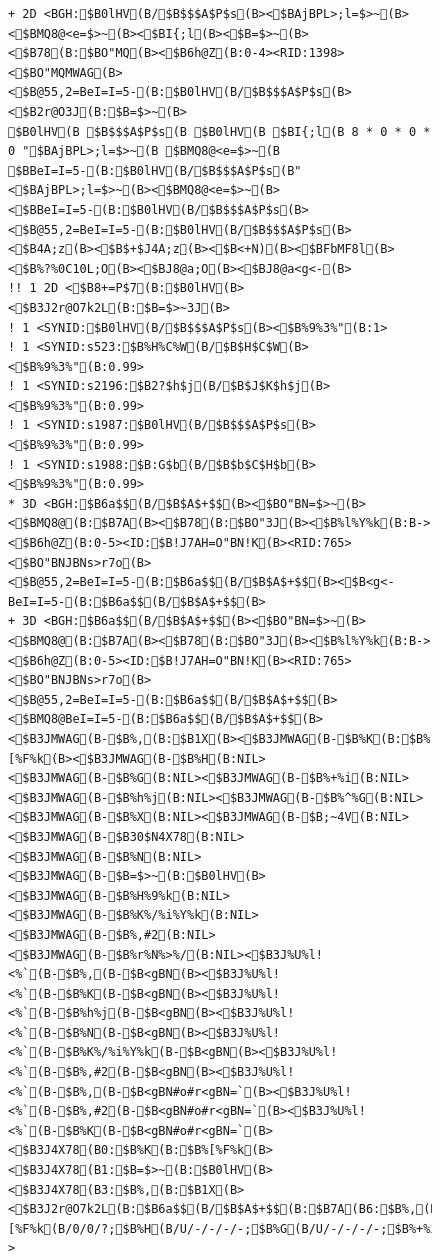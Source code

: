 \documentclass[a4j]{jarticle}
\begin{document}
{{{{{{{{{\begin{figure}[t]
\begin{center}
\begin{minipage}{\hsize}
\begin{verbatim}
+ 2D <BGH:$B0lHV(B/$B$$$A$P$s(B><$BAjBPL>;l=$>~(B><$BMQ8@<e=$>~(B><$BI{;l(B><$B=$>~(B><$B78(B:$BO"MQ(B><$B6h@Z(B:0-4><RID:1398><$BO"MQMWAG(B><$B@55,2=BeI=I=5-(B:$B0lHV(B/$B$$$A$P$s(B><$B2r@O3J(B:$B=$>~(B>
$B0lHV(B $B$$$A$P$s(B $B0lHV(B $BI{;l(B 8 * 0 * 0 * 0 "$BAjBPL>;l=$>~(B $BMQ8@<e=$>~(B $BBeI=I=5-(B:$B0lHV(B/$B$$$A$P$s(B" <$BAjBPL>;l=$>~(B><$BMQ8@<e=$>~(B><$BBeI=I=5-(B:$B0lHV(B/$B$$$A$P$s(B><$B@55,2=BeI=I=5-(B:$B0lHV(B/$B$$$A$P$s(B><$B4A;z(B><$B$+$J4A;z(B><$B<+N)(B><$BFbMF8l(B><$B%?%0C10L;O(B><$BJ8@a;O(B><$BJ8@a<g<-(B>
!! 1 2D <$B8+=P$7(B:$B0lHV(B><$B3J2r@O7k2L(B:$B=$>~3J(B>
! 1 <SYNID:$B0lHV(B/$B$$$A$P$s(B><$B%9%3%"(B:1>
! 1 <SYNID:s523:$B%H%C%W(B/$B$H$C$W(B><$B%9%3%"(B:0.99>
! 1 <SYNID:s2196:$B2?$h$j(B/$B$J$K$h$j(B><$B%9%3%"(B:0.99>
! 1 <SYNID:s1987:$B0lHV(B/$B$$$A$P$s(B><$B%9%3%"(B:0.99>
! 1 <SYNID:s1988:$B:G$b(B/$B$b$C$H$b(B><$B%9%3%"(B:0.99>
* 3D <BGH:$B6a$$(B/$B$A$+$$(B><$BO"BN=$>~(B><$BMQ8@(B:$B7A(B><$B78(B:$BO"3J(B><$B%l%Y%k(B:B-><$B6h@Z(B:0-5><ID:$B!J7AH=O"BN!K(B><RID:765><$BO"BNJBNs>r7o(B><$B@55,2=BeI=I=5-(B:$B6a$$(B/$B$A$+$$(B><$B<g<-BeI=I=5-(B:$B6a$$(B/$B$A$+$$(B>
+ 3D <BGH:$B6a$$(B/$B$A$+$$(B><$BO"BN=$>~(B><$BMQ8@(B:$B7A(B><$B78(B:$BO"3J(B><$B%l%Y%k(B:B-><$B6h@Z(B:0-5><ID:$B!J7AH=O"BN!K(B><RID:765><$BO"BNJBNs>r7o(B><$B@55,2=BeI=I=5-(B:$B6a$$(B/$B$A$+$$(B><$BMQ8@BeI=I=5-(B:$B6a$$(B/$B$A$+$$(B><$B3JMWAG(B-$B%,(B:$B1X(B><$B3JMWAG(B-$B%K(B:$B%[%F%k(B><$B3JMWAG(B-$B%H(B:NIL><$B3JMWAG(B-$B%G(B:NIL><$B3JMWAG(B-$B%+%i(B:NIL><$B3JMWAG(B-$B%h%j(B:NIL><$B3JMWAG(B-$B%^%G(B:NIL><$B3JMWAG(B-$B%X(B:NIL><$B3JMWAG(B-$B;~4V(B:NIL><$B3JMWAG(B-$B30$N4X78(B:NIL><$B3JMWAG(B-$B%N(B:NIL><$B3JMWAG(B-$B=$>~(B:$B0lHV(B><$B3JMWAG(B-$B%H%9%k(B:NIL><$B3JMWAG(B-$B%K%/%i%Y%k(B:NIL><$B3JMWAG(B-$B%,#2(B:NIL><$B3JMWAG(B-$B%r%N%>%/(B:NIL><$B3J%U%l!<%`(B-$B%,(B-$B<gBN(B><$B3J%U%l!<%`(B-$B%K(B-$B<gBN(B><$B3J%U%l!<%`(B-$B%h%j(B-$B<gBN(B><$B3J%U%l!<%`(B-$B%N(B-$B<gBN(B><$B3J%U%l!<%`(B-$B%K%/%i%Y%k(B-$B<gBN(B><$B3J%U%l!<%`(B-$B%,#2(B-$B<gBN(B><$B3J%U%l!<%`(B-$B%,(B-$B<gBN#o#r<gBN=`(B><$B3J%U%l!<%`(B-$B%,#2(B-$B<gBN#o#r<gBN=`(B><$B3J%U%l!<%`(B-$B%K(B-$B<gBN#o#r<gBN=`(B><$B3J4X78(B0:$B%K(B:$B%[%F%k(B><$B3J4X78(B1:$B=$>~(B:$B0lHV(B><$B3J4X78(B3:$B%,(B:$B1X(B><$B3J2r@O7k2L(B:$B6a$$(B/$B$A$+$$(B:$B7A(B6:$B%,(B/N/$B1X(B/3/0/?;$B%K(B/C/$B%[%F%k(B/0/0/?;$B%H(B/U/-/-/-/-;$B%G(B/U/-/-/-/-;$B%+%i(B/U/-/-/-/-;$B%h%j(B/U/-/-/-/-;$B%^%G(B/U/-/-/-/-;$B%X(B/U/-/-/-/-;$B;~4V(B/U/-/-/-/-;$B30$N4X78(B/U/-/-/-/-;$B%N(B/U/-/-/-/-;$B=$>~(B/C/$B0lHV(B/1/0/?;$B%H%9%k(B/U/-/-/-/-;$B%K%/%i%Y%k(B/U/-/-/-/-;$B%,#2(B/U/-/-/-/-;$B%r%N%>%/(B/U/-/-/-/->

\end{verbatim}
\end{minipage}
\end{center}
\end{figure}}}}}}}}}}
\end{document}
